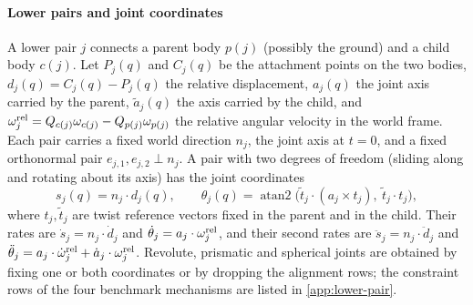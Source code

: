 \documentclass[preprint,12pt]{elsarticle}
\begin{document}
\paragraph{Lower pairs and joint coordinates}
A lower pair $j$ connects a parent body $p(j)$ (possibly the ground) and a child body $c(j)$. Let
$P_j(q)$ and $C_j(q)$ be the attachment points on the two bodies, $d_j(q)=C_j(q)-P_j(q)$ the
relative displacement, $a_j(q)$ the joint axis carried by the parent, $\tilde a_j(q)$ the axis
carried by the child, and $\omega^{\rm rel}_j=Q_{c(j)}\omega_{c(j)}-Q_{p(j)}\omega_{p(j)}$ the
relative angular velocity in the world frame. Each pair carries a fixed world direction $n_j$, the
joint axis at $t=0$, and a fixed orthonormal pair $e_{j,1},e_{j,2}\perp n_j$. A pair with two
degrees of freedom (sliding along and rotating about its axis) has the joint coordinates
\begin{equation}
  s_j(q)=n_j\cdot d_j(q),\qquad
  \theta_j(q)=\operatorname{atan2}\bigl(\tilde t_j\cdot(a_j\times t_j),\ \tilde t_j\cdot t_j\bigr),
  \label{eq:joint-coordinates}
\end{equation}
where $t_j,\tilde t_j$ are twist reference vectors fixed in the parent and in the child. Their
rates are $\dot s_j=n_j\cdot\dot d_j$ and $\dot\theta_j=a_j\cdot\omega^{\rm rel}_j$, and their
second rates are $\ddot s_j=n_j\cdot\ddot d_j$ and
$\ddot\theta_j=a_j\cdot\dot\omega^{\rm rel}_j+\dot a_j\cdot\omega^{\rm rel}_j$. Revolute,
prismatic and spherical joints are obtained by fixing one or both coordinates or by dropping the
alignment rows; the constraint rows of the four benchmark mechanisms are listed in
\ref{app:lower-pair}.
\end{document}
